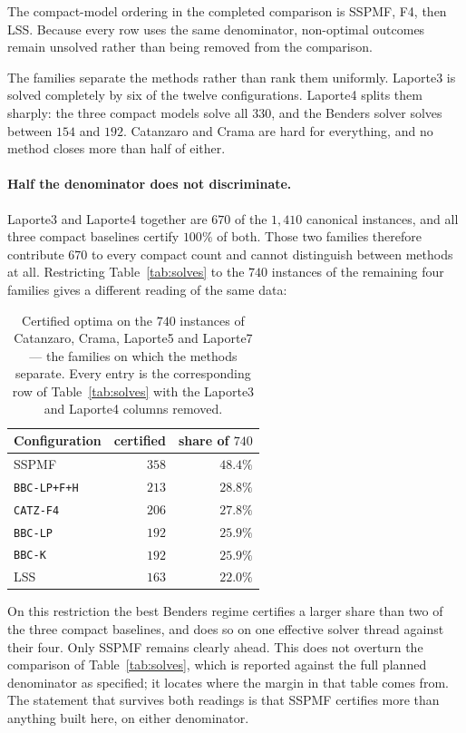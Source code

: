 The compact-model ordering in the completed comparison is SSPMF, F4, then LSS.
Because every row uses the same denominator, non-optimal outcomes remain unsolved
rather than being removed from the comparison.

The families separate the methods rather than rank them uniformly. Laporte3 is solved
completely by six of the twelve configurations. Laporte4 splits them sharply: the
three compact models solve all $330$, and the Benders solver solves between $154$ and
$192$. Catanzaro and Crama are hard for everything, and no method closes more than
half of either.

\paragraph{Half the denominator does not discriminate.}
Laporte3 and Laporte4 together are $670$ of the $1{,}410$ canonical instances, and all
three compact baselines certify $100\%$ of both. Those two families therefore contribute
$670$ to every compact count and cannot distinguish between methods at all. Restricting
Table~\ref{tab:solves} to the $740$ instances of the remaining four families gives a
different reading of the same data:

\begin{table}[h]\centering
\footnotesize
\begin{tabular}{@{}lrr@{}}
\toprule
Configuration & certified & share of $740$\\
\midrule
SSPMF               & $358$ & $48.4\%$\\
\texttt{BBC-LP+F+H} & $213$ & $28.8\%$\\
\texttt{CATZ-F4}    & $206$ & $27.8\%$\\
\texttt{BBC-LP}     & $192$ & $25.9\%$\\
\texttt{BBC-K}      & $192$ & $25.9\%$\\
LSS                 & $163$ & $22.0\%$\\
\bottomrule
\end{tabular}
\caption{Certified optima on the $740$ instances of Catanzaro, Crama, Laporte5 and
Laporte7 --- the families on which the methods separate. Every entry is the corresponding
row of Table~\ref{tab:solves} with the Laporte3 and Laporte4 columns removed.}
\label{tab:discriminating}
\end{table}

On this restriction the best Benders regime certifies a larger share than two of the three
compact baselines, and does so on one effective solver thread against their four. Only
SSPMF remains clearly ahead. This does not overturn the comparison of
Table~\ref{tab:solves}, which is reported against the full planned denominator as
specified; it locates where the margin in that table comes from. The statement that
survives both readings is that SSPMF certifies more than anything built here, on either
denominator.


